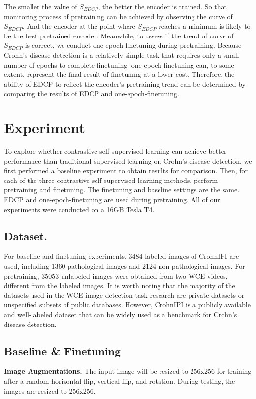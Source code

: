 \documentclass[conference]{IEEEtran}
\begin{document}
The smaller the value of $S_{EDCP}$, the better the encoder is trained. So that monitoring process of pretraining can be achieved by observing the curve of $S_{EDCP}$. And the encoder at the point where $S_{EDCP}$ reaches a minimum is likely to be the best pretrained encoder. 
Meanwhile, to assess if the trend of curve of $S_{EDCP}$ is correct, we conduct one-epoch-finetuning during pretraining. Because Crohn's disease detection is a relatively simple task that requires only a small number of epochs to complete finetuning, one-epoch-finetuning can, to some extent, represent the final result of finetuning at a lower cost. Therefore, the ability of EDCP to reflect the encoder's pretraining trend can be determined by comparing the results of EDCP and one-epoch-finetuning.


\section{Experiment}
To explore whether contrastive self-supervised learning can achieve better performance than traditional supervised learning on Crohn's disease detection, we first performed a baseline experiment to obtain results for comparison. Then, for each of the three contrastive self-supervised learning methods, perform pretraining and finetuning. The finetuning and baseline settings are the same. EDCP and one-epoch-finetuning are used during pretraining. All of our experiments were conducted on a 16GB Tesla T4.
\subsection{Dataset.} 
For baseline and finetuning experiments, 3484 labeled images of CrohnIPI\cite{crohIPI} are used, including 1360 pathological images and 2124 non-pathological images. For pretraining, 35053 unlabeled images were obtained from two WCE videos, different from the labeled images. It is worth noting that the majority of the datasets used in the WCE image detection task research are private datasets or unspecified subsets of public databases. However, CrohnIPI is a publicly available and well-labeled dataset that can be widely used as a benchmark for Crohn's disease detection.

\rm\subsection{Baseline \& Finetuning}



\textbf{Image Augmentations.}  
The input image will be resized to 256x256 for training after a random horizontal flip, vertical flip, and rotation. During testing, the images are resized to 256x256.
\end{document}

